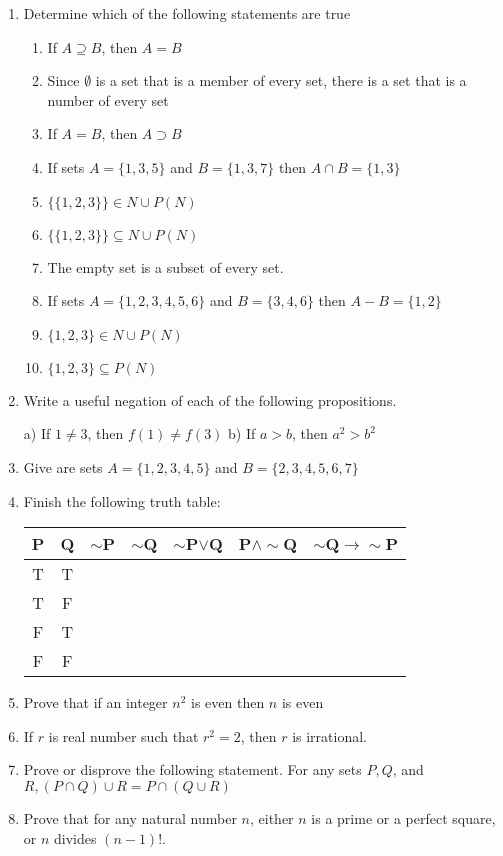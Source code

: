 \begin{enumerate}
	\item Determine which of the following statements are true
	\begin{enumerate}
		\item If $A \supseteq B$, then $A = B$
		\item Since $\emptyset$ is a set that is a member of every set, there is a set that is a number of every set
		\item If $A = B$, then $A \supset B$
		\item If sets $A = \{1,3,5\}$ and $B = \{1,3,7\}$ then $A \cap B = \{1,3\}$
		\item $\{\{ 1,2,3\}\} \in N \cup P(N)$
		\item $\{\{ 1,2,3\}\} \subseteq N \cup P(N)$
		\item The empty set is a subset of every set.
		\item If sets $A = \{1,2,3,4,5,6\}$ and $B = \{3,4,6\}$ then $A - B = \{1,2\}$
		\item $\{1,2,3\} \in N \cup P(N)$
		\item $\{1,2,3\} \subseteq P(N)$
	\end{enumerate}
	
	\item Write a useful negation of each of the following propositions.
	
	a) If $1 \neq 3$, then $f(1) \neq f(3)$ b) If $a > b$, then $a^2 > b^2$
	
	\item Give are sets $A = \{1,2,3,4,5\}$ and $B = \{2,3,4,5,6,7\}$
	
	\item Finish the following truth table:
	
	\begin{tabular}{|c|c|c|c|c|c|c|}
	\hline
	P & Q & $\sim$P & $\sim$Q & $\sim$P$\vee$Q & P$\wedge\sim$Q & $\sim$Q$\rightarrow \sim$P\\
	\hline
	T&T&&&&&\\
	\hline
	T&F&&&&&\\
	\hline
	F&T&&&&&\\
	\hline
	F&F&&&&&\\
	\hline
	\end{tabular}
	\item Prove that if an integer $n^2$ is even then $n$ is even
	\item If $r$ is real number such that $r^2 = 2$, then $r$ is irrational.
	
	\item Prove or disprove the following statement. For any sets $P,Q$, and $R, (P \cap Q) \cup R = P \cap (Q \cup R)$
	\item Prove that for any natural number $n$, either $n$ is a prime or a perfect square, or $n$ divides $(n - 1)!$.

\end{enumerate}






